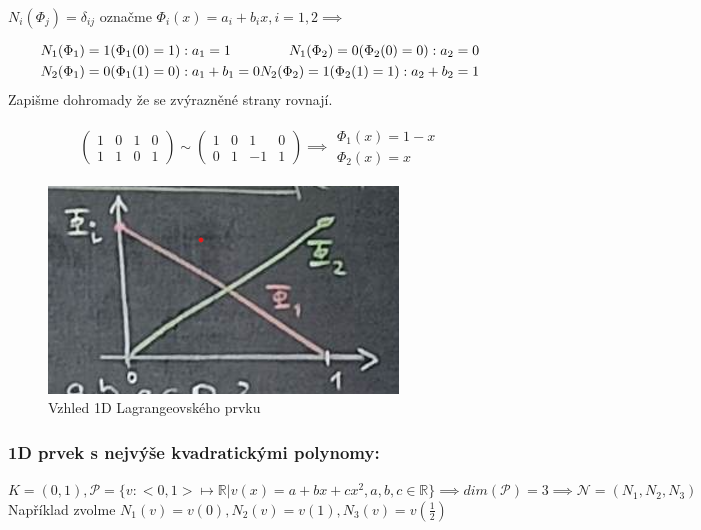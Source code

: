 \documentclass[../main.tex]{subfiles}
\begin{document}
\begin{definition}

    $N_i(\Phi_j) = \delta_{ij}$ označme $\Phi_i(x) = a_i + b_i x, i = 1,2\implies$
    
    \begin{multline}
        N_1(\Phi_1) = 1 (\Phi_1(0) = 1) : a_1 = 1 \hfill  N_1(\Phi_2) = 0 (\Phi_2(0) = 0): a_2 = 0 \\
        N_2(\Phi_1) = 0 (\Phi_1(1) = 0) : a_1 + b_1 = 0 \hfill N_2(\Phi_2) = 1 (\Phi_2(1) = 1): a_2 + b_2 = 1    
    \end{multline}
    Zapišme dohromady že se zvýrazněné strany rovnají. 

    \begin{gather}
    \left(\begin{array}{cc|cc}
        1 & 0 & 1 & 0 \\
        1 & 1 & 0 & 1 
    \end{array}\right)
    \sim
    \left(\begin{array}{cc|cc}
        1 & 0 & 1 & 0 \\
        0 & 1 & -1 & 1 
    \end{array}\right)
    \implies
    \begin{array}{c}
        \Phi_1(x) = 1 - x  \\
        \Phi_2(x) = x
    \end{array}
\end{gather}

    \begin{figure}[ht]
        \centering
        \includegraphics{images/vzhled1dlagrangeprvku.png}
        \caption{Vzhled 1D Lagrangeovského prvku}
    \end{figure}
\end{definition}


\subsubsection{1D prvek s nejvýše kvadratickými polynomy:}
$K = (0,1), \mathcal{P} = \{  v: <0,1> \mapsto \mathbb{R} | v(x) = a + bx + cx^2, a,b,c \in \mathbb{R}       \} \implies dim(\mathcal{P}) = 3 \implies \mathcal{N} = (N_1, N_2, N_3)$
Například zvolme $N_1(v) = v(0), N_2(v) = v(1), N_3(v) = v(\frac{1}{2})$
\end{document}
